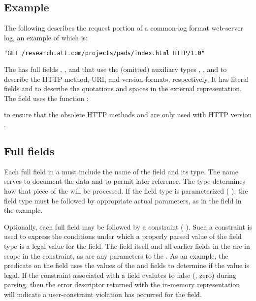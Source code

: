 \subsection{Example}
The following \pads{} \struct{} describes the request portion of a
common-log format web-server log, an example of which is:
\begin{verbatim}
"GET /research.att.com/projects/pads/index.html HTTP/1.0"
\end{verbatim}

\noindent
The \struct{}  has full fields ,
, and  that use the (omitted) auxiliary types
,
, and
 to describe
the HTTP method, URI, and  version formats, respectively.  
It has literal fields  and
 to describe the quotations and spaces in the external
representation. 
The  field uses the \C{}
function :

to ensure that the obsolete HTTP methods
 and  are only used with HTTP version .

\subsection{Full fields}
Each full field in a \struct{} must include the name of the field
and its type.  
The name serves to document the data and to permit later reference.  
The type determines how that piece of the \struct{} will be
processed.  If the field type is parameterized 
(\cf{} ), the field type must be
followed by appropriate actual parameters, as in the 
field in the  example.

Optionally, each full field may be followed by a constraint (\cf{}
).  Such a constraint is used to express
the conditions under which a properly parsed value of the field type
is a legal value for the field.  The field itself and all earlier
fields in the \struct{} are in scope in the constraint, as are any
parameters to the \struct{}.  As an example, the 
predicate on the  field uses the values of the 
and  fields to determine if the  value is
legal.  If the constraint associated with a field evalutes to false
(\ie{}, zero) during parsing, then the error descriptor returned with
the in-memory representation will indicate a user-constraint violation
has occurred for the field.

